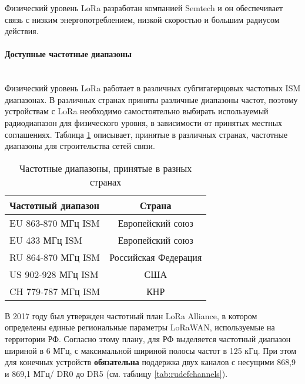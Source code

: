 Физический уровень LoRa разработан компанией Semtech и он обеспечивает связь с низким энергопотреблением, низкой скоростью и большим радиусом действия.

\paragraph{Доступные частотные диапазоны} \hspace{0pt}\\

Физический уровень LoRa работает в различных субгигагерцовых частотных ISM диапазонах.
В различных странах приняты различные диапазоны частот, поэтому устройствам с LoRa необходимо самостоятельно выбирать используемый радиодиапазон для физического уровня, в зависимости от принятых местных соглашениях. 
Таблица \ref{tab:ismbands} описывает, принятые в различных странах, частотные диапазоны для строительства сетей связи.

\begin{table}[ht]
  \caption{Частотные диапазоны, принятые в разных странах}
  \begin{tabular}{|l|c|}
  \hline
	  Частотный диапазон & Страна\\
  \hline
	  EU 863-870 МГц ISM & Европейский союз\\
  \hline
	  EU 433 МГц ISM & Европейский союз\\
  \hline
	  RU 864-870 МГц ISM & Российская Федерация\\
  \hline
	  US 902-928 МГц ISM & США\\
  \hline
	  CH 779-787 МГц ISM & КНР\\
  \hline
  \end{tabular}
  \label{tab:ismbands}
\end{table}

В 2017 году был утвержден частотный план LoRa Alliance, в котором определены единые региональные параметры LoRaWAN, используемые на территории РФ.
Согласно этому плану, для РФ выделяется частотный диапазон шириной в 6 МГц, с максимальной шириной полосы частот в 125 кГц.
При этом для конечных устройств \textbf{обязательна} поддержка двух каналов с несущими 868,9 и 869,1 МГц/ DR0 до DR5 (см. таблицу \ref{tab:rudefchannels}).


